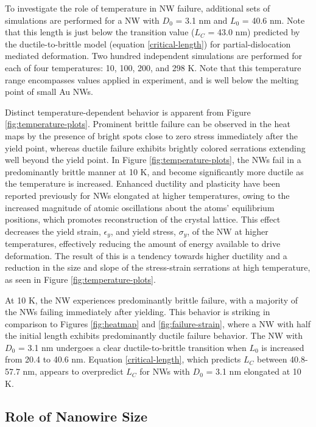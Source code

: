 \documentclass[10pt]{report}  %
\newcommand\findent{\hspace*{\parindent}}
\begin{document}
\findent To investigate the role of temperature in NW failure, additional sets of simulations are performed for a NW with $D_{0}$ = 3.1 nm and $L_{0}$ = 40.6 nm. Note that this length is just below the transition value ($L_{C}$ = 43.0 nm) predicted by the ductile-to-brittle model (equation \ref{critical-length}) for partial-dislocation mediated deformation. Two hundred independent simulations are performed for each of four temperatures: 10, 100, 200, and 298 K. Note that this temperature range encompasses values applied in experiment, \cite{Tsutsui_nl:2008,Yanson:1998,Scheer:1998} and is well below the melting point of small Au NWs. \cite{Pu:2007} 

Distinct temperature-dependent behavior is apparent from Figure \ref{fig:temperature-plots}. Prominent brittle failure can be observed in the heat maps by the presence of bright spots close to zero stress immediately after the yield point, whereas ductile failure exhibits brightly colored serrations extending well beyond the yield point. In Figure \ref{fig:temperature-plots}, the NWs fail in a predominantly brittle manner at 10 K, and become significantly more ductile as the temperature is increased. Enhanced ductility and plasticity have been reported previously \cite{Koh:2005} for NWs elongated at higher temperatures, owing to the increased magnitude of atomic oscillations about the atoms' equilibrium positions, which promotes reconstruction of the crystal lattice. This effect decreases the yield strain, $\epsilon_{y}$, and yield stress, $\sigma_{y}$, of the NW at higher temperatures, effectively reducing the amount of energy available to drive deformation. The result of this is a tendency towards higher ductility and a reduction in the size and slope of the stress-strain serrations at high temperature, as seen in Figure \ref{fig:temperature-plots}. 

At 10 K, the NW experiences predominantly brittle failure, with a majority of the NWs failing immediately after yielding. This behavior is striking in comparison to Figures \ref{fig:heatmap} and \ref{fig:failure-strain}, where a NW with half the initial length exhibits predominantly ductile failure behavior. The NW with $D_{0}$ = 3.1 nm undergoes a clear ductile-to-brittle transition when $L_{0}$ is increased from 20.4 to 40.6 nm. Equation \ref{critical-length}, which predicts $L_{C}$ between 40.8-57.7 nm, appears to overpredict $L_{C}$ for NWs with $D_{0}$ = 3.1 nm elongated at 10 K. 


\subsection{Role of Nanowire Size}
\end{document}
